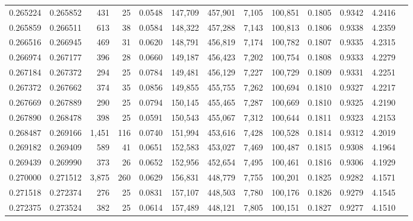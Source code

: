 \begin{tabular}{rrrrrrrrrrrrr}
0.265224 & 0.265852 &   431 &  25 &                                     0.0548 & 147,709 & 457,901 &   7,105 & 100,851 & 0.1805 & 0.9342 & 4.2416 \\
0.265859 & 0.266511 &   613 &  38 &                                     0.0584 & 148,322 & 457,288 &   7,143 & 100,813 & 0.1806 & 0.9338 & 4.2359 \\
0.266516 & 0.266945 &   469 &  31 &                                     0.0620 & 148,791 & 456,819 &   7,174 & 100,782 & 0.1807 & 0.9335 & 4.2315 \\
0.266974 & 0.267177 &   396 &  28 &                                     0.0660 & 149,187 & 456,423 &   7,202 & 100,754 & 0.1808 & 0.9333 & 4.2279 \\
0.267184 & 0.267372 &   294 &  25 &                                     0.0784 & 149,481 & 456,129 &   7,227 & 100,729 & 0.1809 & 0.9331 & 4.2251 \\
0.267372 & 0.267662 &   374 &  35 &                                     0.0856 & 149,855 & 455,755 &   7,262 & 100,694 & 0.1810 & 0.9327 & 4.2217 \\
0.267669 & 0.267889 &   290 &  25 &                                     0.0794 & 150,145 & 455,465 &   7,287 & 100,669 & 0.1810 & 0.9325 & 4.2190 \\
0.267890 & 0.268478 &   398 &  25 &                                     0.0591 & 150,543 & 455,067 &   7,312 & 100,644 & 0.1811 & 0.9323 & 4.2153 \\
0.268487 & 0.269166 & 1,451 & 116 &                                     0.0740 & 151,994 & 453,616 &   7,428 & 100,528 & 0.1814 & 0.9312 & 4.2019 \\
0.269182 & 0.269409 &   589 &  41 &                                     0.0651 & 152,583 & 453,027 &   7,469 & 100,487 & 0.1815 & 0.9308 & 4.1964 \\
0.269439 & 0.269990 &   373 &  26 &                                     0.0652 & 152,956 & 452,654 &   7,495 & 100,461 & 0.1816 & 0.9306 & 4.1929 \\
0.270000 & 0.271512 & 3,875 & 260 &                                     0.0629 & 156,831 & 448,779 &   7,755 & 100,201 & 0.1825 & 0.9282 & 4.1571 \\
0.271518 & 0.272374 &   276 &  25 &                                     0.0831 & 157,107 & 448,503 &   7,780 & 100,176 & 0.1826 & 0.9279 & 4.1545 \\
0.272375 & 0.273524 &   382 &  25 &                                     0.0614 & 157,489 & 448,121 &   7,805 & 100,151 & 0.1827 & 0.9277 & 4.1510 \\

\end{tabular}
